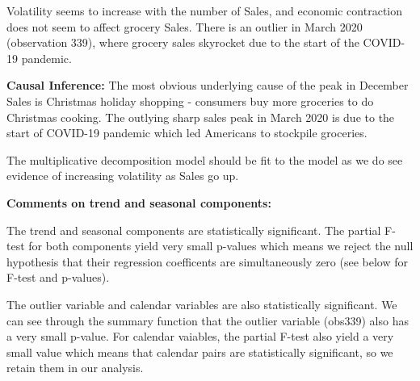 \documentclass[
]{article}
\newenvironment{Shaded}{\begin{snugshade}}{\end{snugshade}}
\newcommand{\AttributeTok}[1]{\textcolor[rgb]{0.13,0.29,0.53}{#1}}
\newcommand{\CommentTok}[1]{\textcolor[rgb]{0.56,0.35,0.01}{\textit{#1}}}
\newcommand{\DecValTok}[1]{\textcolor[rgb]{0.00,0.00,0.81}{#1}}
\newcommand{\FunctionTok}[1]{\textcolor[rgb]{0.13,0.29,0.53}{\textbf{#1}}}
\newcommand{\NormalTok}[1]{#1}
\newcommand{\OtherTok}[1]{\textcolor[rgb]{0.56,0.35,0.01}{#1}}
\newcommand{\SpecialCharTok}[1]{\textcolor[rgb]{0.81,0.36,0.00}{\textbf{#1}}}
\begin{document}
Volatility seems to increase with the number of Sales, and economic
contraction does not seem to affect grocery Sales. There is an outlier
in March 2020 (observation 339), where grocery sales skyrocket due to
the start of the COVID-19 pandemic.

\textbf{Causal Inference: } The most obvious underlying cause of the
peak in December Sales is Christmas holiday shopping - consumers buy
more groceries to do Christmas cooking. The outlying sharp sales peak in
March 2020 is due to the start of COVID-19 pandemic which led Americans
to stockpile groceries.

The multiplicative decomposition model should be fit to the model as we
do see evidence of increasing volatility as Sales go up.

\textbf{Comments on trend and seasonal components: }

The trend and seasonal components are statistically significant. The
partial F-test for both components yield very small p-values which means
we reject the null hypothesis that their regression coefficents are
simultaneously zero (see below for F-test and p-values).

The outlier variable and calendar variables are also statistically
significant. We can see through the summary function that the outlier
variable (obs339) also has a very small p-value. For calendar vaiables,
the partial F-test also yield a very small value which means that
calendar pairs are statistically significant, so we retain them in our
analysis.

\begin{Shaded}
\end{Shaded}
\end{document}
